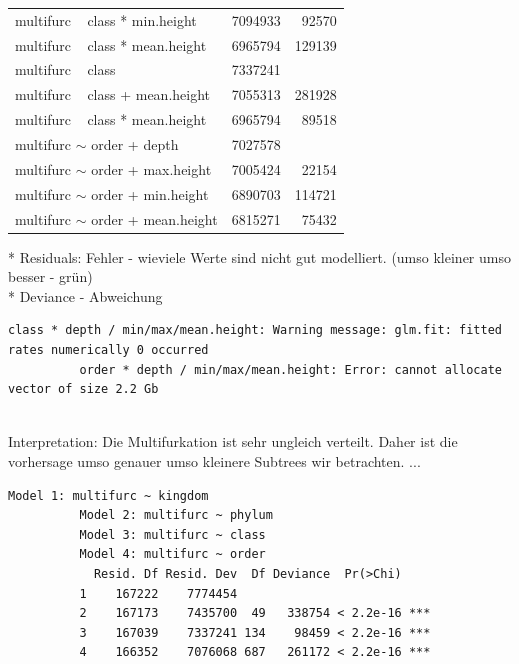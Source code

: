 \begin{center}
\begin{longtable}{ |l|r|r| }
            multifurc ~ class * min.height & 7094933 & 92570 \\
            \rowcolor{green} multifurc ~ class * mean.height & 6965794 & 129139 \\
            \hline \hline
            multifurc ~ class & 7337241 & \\
            multifurc ~ class + mean.height & 7055313 & 281928 \\
            \rowcolor{green} multifurc ~ class * mean.height & 6965794 & 89518 \\
            \hline \hline \hline
            multifurc $\sim$ order + depth & 7027578 & \\
            multifurc $\sim$ order + max.height & 7005424 & 22154 \\
            multifurc $\sim$ order + min.height & 6890703 & 114721 \\
            \rowcolor{green} multifurc $\sim$ order + mean.height & 6815271 & 75432 \\
            \hline
          \end{longtable}
        \end{center}
        * Residuals: Fehler - wieviele Werte sind nicht gut modelliert. (umso kleiner umso besser - grün) \\
        * Deviance - Abweichung \\
        
        \begin{lstlisting}[gobble=8]
          class * depth / min/max/mean.height: Warning message: glm.fit: fitted rates numerically 0 occurred
          order * depth / min/max/mean.height: Error: cannot allocate vector of size 2.2 Gb
        \end{lstlisting}

         \\
        Interpretation: Die Multifurkation ist sehr ungleich verteilt. Daher ist die vorhersage umso 
          genauer umso kleinere Subtrees wir betrachten. ...
        \begin{lstlisting}[gobble=8]
          Model 1: multifurc ~ kingdom
          Model 2: multifurc ~ phylum
          Model 3: multifurc ~ class
          Model 4: multifurc ~ order
            Resid. Df Resid. Dev  Df Deviance  Pr(>Chi)
          1    167222    7774454
          2    167173    7435700  49   338754 < 2.2e-16 ***
          3    167039    7337241 134    98459 < 2.2e-16 ***
          4    166352    7076068 687   261172 < 2.2e-16 ***
        \end{lstlisting}
         \\ \\


